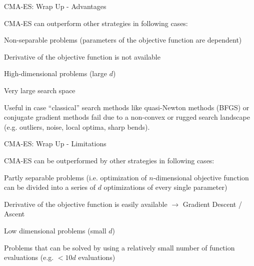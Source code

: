 \documentclass[11pt,compress,t,notes=noshow, xcolor=table]{beamer}
\begin{document}
\begin{framei}[sep=L]{CMA-ES: Wrap Up - Advantages}
\item CMA-ES can outperform other strategies in following cases:
\item Non-separable problems (parameters of the objective function are dependent)
\item Derivative of the objective function is not available
\item High-dimensional problems (large $d$)
\item Very large search space
\item Useful in case \enquote{classical} search methods like quasi-Newton methods (BFGS) or conjugate gradient methods fail due to a non-convex or rugged search landscape (e.g. outliers, noise, local optima, sharp bends).
\end{framei}


\begin{framei}[sep=L]{CMA-ES: Wrap Up - Limitations}
\item CMA-ES can be outperformed by other strategies in following cases:
\item Partly separable problems (i.e. optimization of $n$-dimensional objective function can be divided into a series of $d$ optimizations of every single parameter)
\item Derivative of the objective function is easily available $\rightarrow$ Gradient Descent / Ascent
\item Low dimensional problems (small $d$)
\item Problems that can be solved by using a relatively small number of function evaluations (e.g. $< 10 d$ evaluations)
\end{framei}
\end{document}
